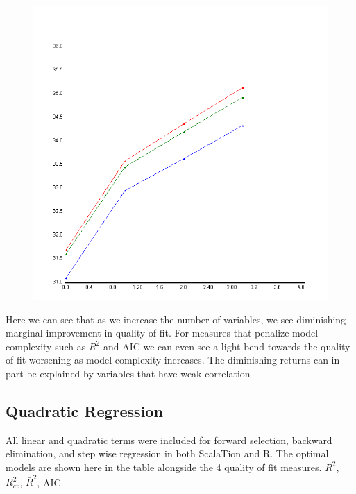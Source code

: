 \documentclass{article}
\begin{document}
\begin{figure}
\begin{center}
		
		\includegraphics[scale=0.25]{../plots/Wine/Scala/MultipleLinearRegressionStepReg.png}
	\end{center}
	\end{figure}

	
	Here we can see that as we increase the number of variables, we see diminishing marginal improvement in quality of 
	fit. For measures that penalize model complexity such as $R^2$ and AIC we can even see a light bend towards 
	the quality of fit worsening as model complexity increases. The diminishing returns can in part be explained by 
	variables that have weak correlation 
	
	
	
	\subsection{Quadratic Regression} 
	
	All linear and quadratic terms were included for forward selection, backward elimination, 
	and step wise regression in both ScalaTion and R. The optimal models are shown here 
	in the table alongside the 4 quality of fit measures. $R^2$, $R^2_{cv}$, $\bar R^2$, AIC. 
			
\end{document}
